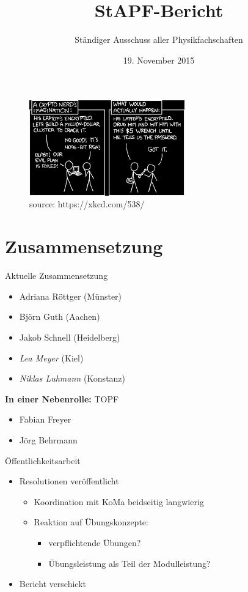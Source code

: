 \documentclass[compress,]{beamer}
\title[StAPf-Bericht]{StAPF-Bericht}
\author{Ständiger Ausschuss aller Physikfachschaften}
\institute[Zusammenkunft aller Physikfachschaften]
\date{19. November 2015}
\begin{document}
\begin{frame}[plain]{}
  \titlepage

   \begin{figure}
     \centering
     \includegraphics[width=0.6\textwidth]{security_inverted.png}
	 \\ \hspace{3cm} {\tiny source: https://xkcd.com/538/}
   \end{figure}
\end{frame}

\section{Zusammensetzung}

\begin{frame}{Aktuelle Zusammensetzung}
	\begin{itemize}
		\item Adriana Röttger (Münster)
		\item Björn Guth (Aachen)
		\item Jakob Schnell (Heidelberg)
		\item \emph{Lea Meyer} (Kiel)
		\item \emph{Niklas Luhmann} (Konstanz)
	\end{itemize}
	\textbf{In einer Nebenrolle:} TOPF
	\begin{itemize}
		\item Fabian Freyer
		\item Jörg Behrmann
	\end{itemize}
\end{frame}

\begin{frame}{Öffentlichkeitsarbeit}
	\begin{itemize}
		\item Resolutionen veröffentlicht
			\begin{itemize}
				\item Koordination mit KoMa beidseitig langwierig
				\item Reaktion auf Übungskonzepte:
					\begin{itemize}
						\item verpflichtende Übungen?
						\item Übungsleistung als Teil der Modulleistung?
					\end{itemize}
			\end{itemize}
		\item Bericht verschickt
	\end{itemize}
\end{frame}
\end{document}
